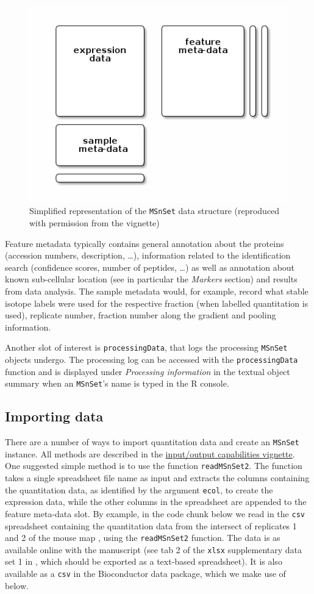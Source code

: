 \begin{figure}[!ht]
  \centering
  \includegraphics[width=.5\textwidth]{./Figures/msnset.png}
  \caption{Simplified representation of the \texttt{MSnSet} data
    structure (reproduced with permission from the 
    vignette)}
  \label{fig:msnset}
\end{figure}

Feature metadata typically contains general annotation about the
proteins (accession numbers, description, \ldots), information related
to the identification search (confidence scores, number of peptides,
\ldots) as well as annotation about known sub-cellular location (see in
particular the \textit{Markers} section) and results from data
analysis. The sample metadata would, for example, record what stable
isotope labels were used for the respective fraction (when labelled
quantitation is used), replicate number, fraction number along the
gradient and pooling information.

Another slot of interest is \texttt{processingData}, that logs the
processing \texttt{MSnSet} objects undergo. The processing log can be
accessed with the \texttt{processingData} function and is displayed
under \textit{Processing information} in the textual object summary
when an \texttt{MSnSet}'s name is typed in the R console.

\subsection*{Importing data}

There are a number of ways to import quantitation data and create an
\texttt{MSnSet} instance. All methods are described in the
\href{http://bioconductor.org/packages/release/bioc/vignettes/MSnbase/inst/doc/MSnbase-io.pdf}{input/output
  capabilities vignette}. One suggested simple method is to use the
function \texttt{readMSnSet2}. The function takes a single spreadsheet
file name as input and extracts the columns containing the
quantitation data, as identified by the argument \texttt{ecol}, to
create the expression data, while the other columns in the spreadsheet
are appended to the feature meta-data slot.  By example, in the code
chunk below we read in the \texttt{csv} spreadsheet containing the
quantitation data from the intersect of replicates 1 and 2 of the
mouse map \cite{hyper}, using the \texttt{readMSnSet2} function. The
data is as available online with the manuscript (see tab 2 of the
\texttt{xlsx} supplementary data set 1 in \cite{hyper}, which should
be exported as a text-based spreadsheet). It is also available as a
\texttt{csv} in the Bioconductor  data
package, which we make use of below.

